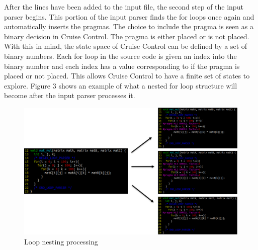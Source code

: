 \documentclass[letterpaper, 10 pt, conference]{IEEEconf}  %
\begin{document}
After the lines have been added to the input file, the second step of the input parser begins. This portion of the input parser finds the for loops once again and automatically inserts the pragmas. The choice to include the pragma is seen as a binary decision in Cruise Control. The pragma is either placed or is not placed. With this in mind, the state space of Cruise Control can be defined by a set of binary numbers. Each for loop in the source code is given an index into the binary number and each index has a value corresponding to if the pragma is placed or not placed. This allows Cruise Control to have a finite set of states to explore. Figure 3 shows an example of what a nested for loop structure will become after the input parser processes it. \newline

\begin{figure}[H]
\centering
\includegraphics[scale=.3]{for_loops.png} 
\caption{Loop nesting processing}
\end{figure}
\end{document}

